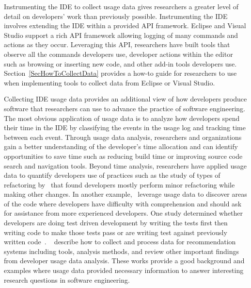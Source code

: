 \documentclass{book}
\begin{document}
Instrumenting the IDE to collect usage data gives researchers a greater level of detail on developers' work than previously possible. Instrumenting the IDE involves extending the IDE within a provided API framework.  Eclipse and Visual Studio support a rich API framework allowing logging of many commands and actions as they occur.  Leveraging this API, researchers have built tools that observe all the commands developers use, developer actions within the editor such as browsing or inserting new code, and other add-in tools developers use.  Section~\ref{SecHowToCollectData} provides a how-to guide for researchers to use when implementing tools to collect data from Eclipse or Visual Studio.  

Collecting IDE usage data provides an additional view of how developers produce software that researchers can use to advance the practice of software engineering.  
The most obvious application of usage data is to analyze how developers spend their time in the IDE by classifying the events in the usage log and tracking time between each event.  Through usage data analysis, researchers and organizations gain a better understanding of the developer's time allocation and can identify opportunities to save time such as reducing build time or improving source code search and navigation tools.  Beyond time analysis, researchers have applied usage data to quantify developers use of practices such as the study of types of refactoring by~ that found developers mostly perform minor refactoring while making other changes.  In another example,~ leverage usage data to discover areas of the code where developers have difficulty with comprehension and should ask for assistance from more experienced developers.  One study determined whether developers are doing test driven development by writing the tests first then writing code to make those tests pass or are writing test against previously written code~\cite{Kou2010Operational}.  ~ describe how to collect and process data for recommendation systems including tools, analysis methods, and review other important findings from developer usage data analysis.    These works provide a good background and examples where usage data provided necessary information to answer interesting research questions in software engineering.

\end{document}
